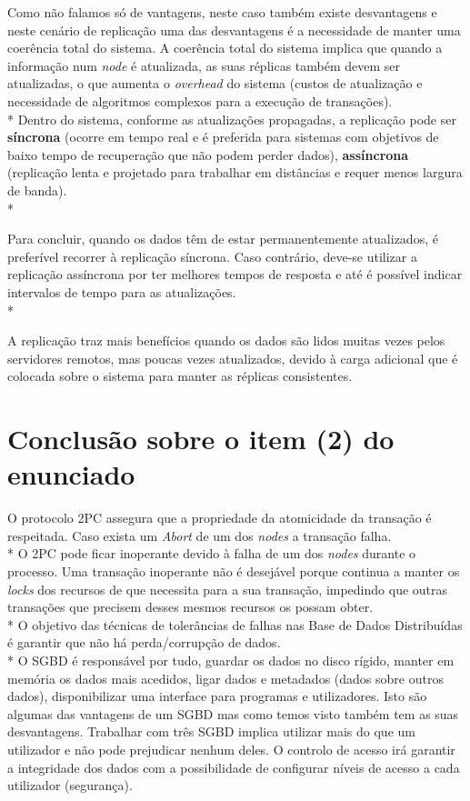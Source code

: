 Como não falamos só de vantagens, neste caso também existe desvantagens e neste cenário de replicação uma das desvantagens é a necessidade de manter uma coerência total do sistema. A coerência total do sistema implica que quando a informação num \textit{node} é atualizada, as suas réplicas também devem ser atualizadas, o que aumenta o \textit{overhead} do sistema (custos de atualização e necessidade de algoritmos complexos para a execução de transações).\\*
\indent Dentro do sistema, conforme as atualizações propagadas, a replicação pode ser \textbf{síncrona} (ocorre em tempo real e é preferida para sistemas com objetivos de baixo tempo de recuperação que não podem perder dados), \textbf{assíncrona} (replicação lenta e projetado para trabalhar em distâncias e requer menos largura de banda).\\*

Para concluir, quando os dados têm de estar permanentemente atualizados, é preferível recorrer à replicação síncrona. Caso contrário, deve-se utilizar a replicação assíncrona por ter melhores tempos de resposta e até é possível indicar intervalos de tempo para as atualizações.\\*

A replicação traz mais benefícios quando os dados são lidos muitas vezes pelos servidores remotos, mas poucas vezes atualizados, devido à carga adicional que é colocada sobre o sistema para manter as réplicas consistentes. 

\cleardoublepage

\section{Conclusão sobre o item (2) do enunciado}
O protocolo \ac{2PC} assegura que a propriedade da atomicidade da transação é respeitada. Caso exista um \textit{Abort} de um dos \textit{nodes} a transação falha.\\*
\indent O \ac{2PC} pode ficar inoperante devido à falha de um dos \textit{nodes} durante o processo. Uma transação inoperante não é desejável porque continua a manter os \textit{locks} dos recursos de que necessita para a sua transação, impedindo que outras transações que precisem desses mesmos recursos os possam obter.\\*
\indent O objetivo das técnicas de tolerâncias de falhas nas Base de Dados Distribuídas é garantir que não há perda/corrupção de dados.\\*
\indent O \ac{SGBD} é responsável por tudo, guardar os dados no disco rígido, manter em memória os dados mais acedidos, ligar dados e metadados (dados sobre outros dados), disponibilizar uma interface para programas e utilizadores. Isto são algumas das vantagens de um \ac{SGBD} mas como temos visto também tem as suas desvantagens. Trabalhar com três \ac{SGBD} implica utilizar mais do que um utilizador e não pode prejudicar nenhum deles. O controlo de acesso irá garantir a integridade dos dados com a possibilidade de configurar níveis de acesso a cada utilizador (segurança). 


